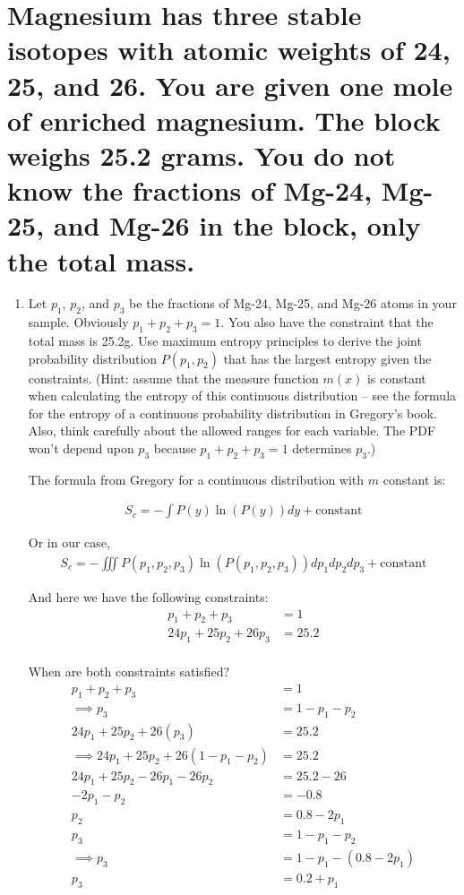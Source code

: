 \section{Magnesium has three stable isotopes with atomic weights of 24, 25, and 26. You are given one mole of enriched magnesium. The block weighs 25.2 grams. You do not know the fractions of Mg-24, Mg-25, and Mg-26 in the block, only the total mass.}

\begin{enumerate}[label=\textbf{\Alph*}.]
    \item Let $p_1$, $p_2$, and $p_3$ be the fractions of Mg-24, Mg-25, and Mg-26 atoms in your sample. Obviously $p_1+p_2+p_3=1$. You also have the constraint that the total mass is 25.2g. Use maximum entropy principles to derive the joint probability distribution $P(p_1,p_2)$ that has the largest entropy given the constraints. (Hint: assume that the measure function $m(x)$ is constant when calculating the entropy of this continuous distribution -- see the formula for the entropy of a continuous probability distribution in Gregory's book. Also, think carefully about the allowed ranges for each variable. The PDF won't depend upon $p_3$ because $p_1+p_2+p_3=1$ determines $p_3$.)

    The formula from Gregory for a continuous distribution with $m$ constant is:

    \begin{align*}
        S_c = -\int P(y) \ln(P(y)) dy + \text{constant}
    \end{align*}

    Or in our case,
    \begin{align*}
        S_c = -\iiint P(p_1, p_2, p_3) \ln(P(p_1, p_2, p_3)) dp_1 dp_2 dp_3 + \text{constant}
    \end{align*}

    And here we have the following constraints:
    \begin{align*}
        p_1+p_2+p_3 &= 1\\
        24p_1 + 25p_2 + 26p_3 &= 25.2 \\
    \end{align*}

    When are both constraints satisfied?
    \begin{align*}
        p_1 + p_2 + p_3 &= 1 \\
        \implies p_3 &= 1 - p_1 - p_2 \\
        24p_1 + 25p_2 + 26(p_3) &= 25.2\\
        \implies 24p_1 + 25p_2 + 26(1 - p_1 - p_2) &= 25.2\\
        24p_1 + 25p_2 - 26p_1 - 26p_2 &= 25.2 - 26\\
        -2p_1 - p_2 &= -0.8\\
        p_2 &= 0.8 - 2p_1\\
        p_3 &= 1 - p_1 - p_2 \\
        \implies p_3 &= 1 - p_1 - (0.8 - 2p_1) \\
        p_3 &= 0.2 + p_1 \\
    \end{align*}


\end{enumerate}
